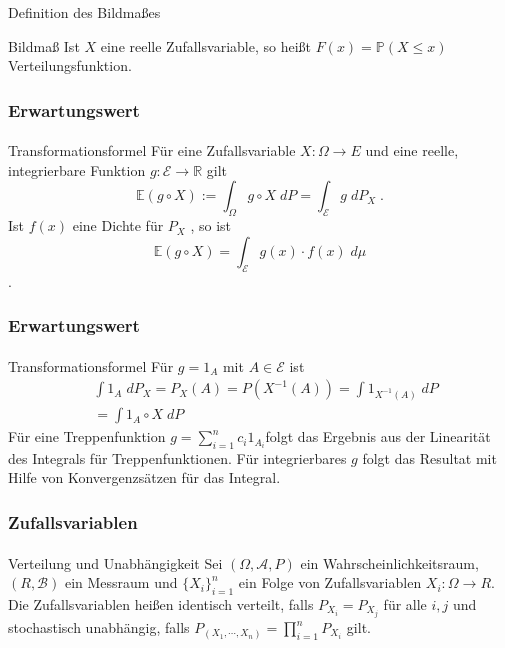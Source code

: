 \documentclass{beamer}
\begin{document}
\begin{frame}{Definition des Bildmaßes}

\begin{block}{Bildmaß}
    Ist $X$ eine reelle Zufallsvariable, so heißt 
    $F(x) = \mathbb{P}(X \leq x)$ Verteilungsfunktion.
\end{block}
\end{frame}




\begin{frame}
    \frametitle{Erwartungswert}
\framesubtitle{}
\begin{block}{Transformationsformel}
Für eine  Zufallsvariable $X:\Omega \to E$ und eine reelle, integrierbare Funktion $g:   \mathcal{E} \to \mathbb{R}$ gilt
$$ \mathbb{E} (g \circ X) := \int_{\Omega} g \circ X \; dP = \int_{\mathcal{E}}  g \; dP_X \;. $$
Ist $f(x)$ eine Dichte für $P_X$ , so ist  
$$\mathbb{E} (g \circ X) =  \int_{\mathcal{E}} g(x) \cdot f(x) \; d\mu$$.
\end{block}
 \end{frame}

 \begin{frame}
    \frametitle{Erwartungswert}
\framesubtitle{}
\begin{block}{Transformationsformel}
Für $g = 1_A$ mit $A \in \mathcal{E}$ ist
\begin{align*}
& \int 1_A \; dP_X = P_X(A) = P(X^{-1} (A)) = \int 1_{X^{-1}(A)} \; dP \\
&= \int 1_{A} \circ X \; dP
\end{align*}
Für eine Treppenfunktion $g= \sum_{i= 1}^n c_i 1_{A_i} $folgt das Ergebnis aus der Linearität des Integrals  für Treppenfunktionen. Für integrierbares $g$ folgt das Resultat mit Hilfe von Konvergenzsätzen für das  Integral.
\end{block}
 \end{frame}



\begin{frame}
    \frametitle{Zufallsvariablen}
\framesubtitle{}
\begin{block}{Verteilung und Unabhängigkeit}
Sei $(\Omega, \mathcal{A}, P)$ ein Wahrscheinlichkeitsraum, $(R, \mathcal{B})$ ein Messraum  und
 $\{X_i\}_{i=1}^n$ ein Folge von Zufallsvariablen   $X_i :  \Omega \to R$.
Die Zufallsvariablen heißen identisch verteilt, falls
 $P_{X_i} = P_{X_j}$ für alle $i,j$  und
stochastisch unabhängig, falls
 $P_{(X_1, \cdots ,X_n)} = \prod_{i=1}^n P_{X_i}$ gilt. 
\end{block}
 \end{frame}
\end{document}
